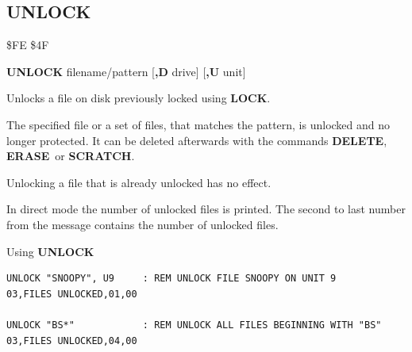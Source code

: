 \subsection{UNLOCK}
\begin{description}[leftmargin=2cm,style=nextline]
\item [Token:]    \$FE \$4F

\item [Format:]   {\bf UNLOCK} filename/pattern [{\bf,D} drive] [{\bf,U} unit]

\item [Usage:]    Unlocks a file on disk previously locked using {\bf LOCK}.

                  The specified file or a set of files, that matches the pattern, is unlocked and no longer protected. It can be deleted afterwards with the commands {\bf DELETE}, {\bf ERASE} or {\bf SCRATCH}.

                  \filenamedefinition

                  \drivedefinition

                  \unitdefinition

\item [Remarks:]  Unlocking a file that is already unlocked has no effect.

                  In direct mode the number of unlocked files is printed. The second to last number from the message contains the number of unlocked files.

\item [Examples:] Using {\bf UNLOCK}

\begin{tcolorbox}[colback=black,coltext=white]
\verbatimfont{\codefont}
\begin{verbatim}
UNLOCK "SNOOPY", U9     : REM UNLOCK FILE SNOOPY ON UNIT 9
03,FILES UNLOCKED,01,00

UNLOCK "BS*"            : REM UNLOCK ALL FILES BEGINNING WITH "BS"
03,FILES UNLOCKED,04,00
\end{verbatim}
\end{tcolorbox}
\end{description}


\newpage
